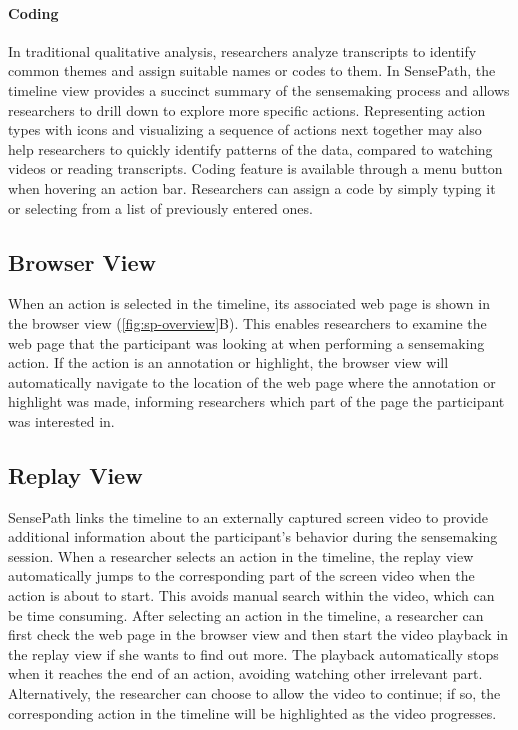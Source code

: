 \paragraph{Coding}
In traditional qualitative analysis, researchers analyze transcripts to identify common themes and assign suitable names or codes to them. In SensePath, the timeline view provides a succinct summary of the sensemaking process and allows researchers to drill down to explore more specific actions. Representing action types with icons and visualizing a sequence of actions next together may also help researchers to quickly identify patterns of the data, compared to watching videos or reading transcripts. Coding feature is available through a menu button when hovering an action bar. Researchers can assign a code by simply typing it or selecting from a list of previously entered ones.

\subsection{Browser View}
\label{sub:webpage}
When an action is selected in the timeline, its associated web page is shown in the browser view (\autoref{fig:sp-overview}B). This enables researchers to examine the web page that the participant was looking at when performing a sensemaking action. If the action is an annotation or highlight, the browser view will automatically navigate to the location of the web page where the annotation or highlight was made, informing researchers which part of the page the participant was interested in.

\subsection{Replay View}
\label{sub:playback}
SensePath links the timeline to an externally captured screen video to provide additional information about the participant's behavior during the sensemaking session. When a researcher selects an action in the timeline, the replay view automatically jumps to the corresponding part of the screen video when the action is about to start. This avoids manual search within the video, which can be time consuming. After selecting an action in the timeline, a researcher can first check the web page in the browser view and then start the video playback in the replay view if she wants to find out more. The playback automatically stops when it reaches the end of an action, avoiding watching other irrelevant part. Alternatively, the researcher can choose to allow the video to continue; if so, the corresponding action in the timeline will be highlighted as the video progresses.

